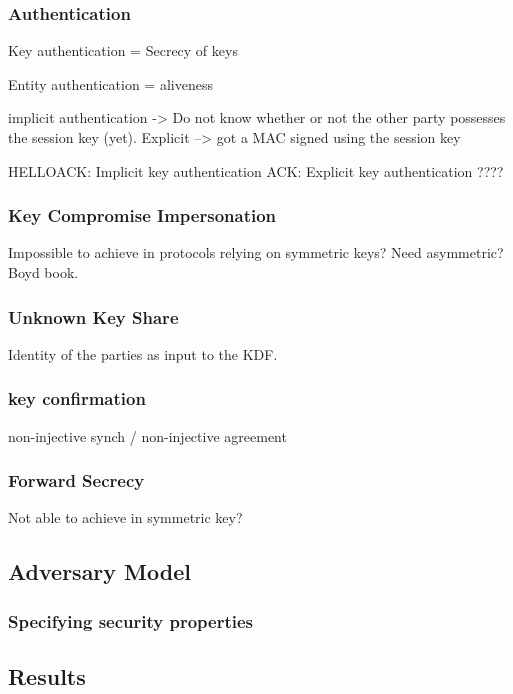 \subsubsection{Authentication}

Key authentication = Secrecy of keys

Entity authentication = aliveness


implicit authentication -> Do not know whether or not the other party possesses the session key (yet). Explicit --> got a MAC signed using the session key


HELLOACK: Implicit key authentication
ACK: Explicit key authentication ????

\subsubsection{Key Compromise Impersonation}

Impossible to achieve in protocols relying on symmetric keys? Need asymmetric? Boyd book.

\subsubsection{Unknown Key Share}

Identity of the parties as input to the KDF. 

\subsubsection{key confirmation}

non-injective synch / non-injective agreement

\subsubsection{Forward Secrecy}

Not able to achieve in symmetric key?


\subsection{Adversary Model}

\subsubsection{Specifying security properties}

\subsection{Results}


